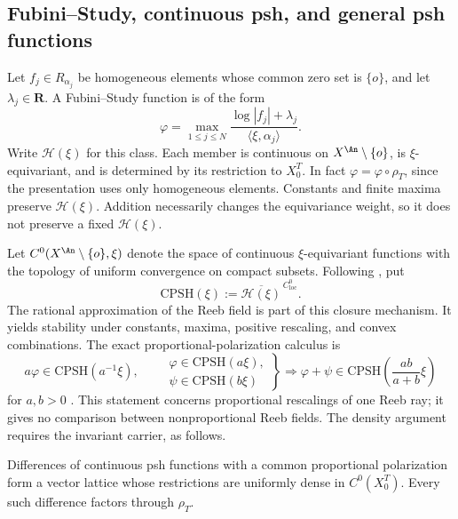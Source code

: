 \subsection{Fubini--Study, continuous psh, and general psh functions}
\label{subsec:local-cone-psh-classes}

Let $f_j\in R_{\alpha_j}$ be homogeneous elements whose common zero set is
$\{o\}$, and let $\lambda_j\in\mathbf R$.  A Fubini--Study function is
of the form
\[
 \varphi
 =\max_{1\leq j\leq N}
       \frac{\log|f_j|+\lambda_j}
            {\langle\xi,\alpha_j\rangle}.
\tag{70.60}\label{eq:local-cone-fs}
\]
Write $\mathcal H(\xi)$ for this class.  Each member is continuous on
$X^{\An}\setminus\{o\}$, is $\xi$-equivariant, and is determined by its
restriction to $X_0^T$.  In fact $\varphi=\varphi\circ\rho_T$, since
the presentation uses only homogeneous elements.  Constants and finite maxima preserve
$\mathcal H(\xi)$.  Addition necessarily changes the equivariance weight,
so it does not preserve a fixed $\mathcal H(\xi)$.

Let $C^0(X^{\An}\setminus\{o\},\xi)$ denote the space of continuous
$\xi$-equivariant functions with the topology of uniform convergence on
compact subsets.  Following \cite[Definition~3.1]{Wu24AffineCones}, put
\[
 \mathrm{CPSH}(\xi)
 :=\overline{\mathcal H(\xi)}^{\,C^0_{\mathrm{loc}}}.
\tag{70.61}\label{eq:local-cone-cpsh}
\]
The rational approximation of the Reeb field is part of this closure
mechanism.  It yields stability under constants, maxima, positive rescaling,
and convex combinations.  The exact proportional-polarization calculus is
\[
 a\varphi\in\mathrm{CPSH}(a^{-1}\xi),
 \qquad
 \left.
 \begin{array}{c}
  \varphi\in\mathrm{CPSH}(a\xi),\\
  \psi\in\mathrm{CPSH}(b\xi)
 \end{array}
 \right\}
 \Longrightarrow
 \varphi+\psi\in
 \mathrm{CPSH}\!\left(\frac{ab}{a+b}\xi\right)
\]
for $a,b>0$ \cite[Proposition~3.3]{Wu24AffineCones}.  This statement
concerns proportional rescalings of one Reeb ray; it gives no comparison
between nonproportional Reeb fields.  The density argument requires the
invariant carrier, as follows.

\begin{proposition}\label{prop:local-cone-invariant-density}
Differences of continuous psh functions with a common proportional
polarization form a vector lattice whose restrictions are uniformly dense
in $C^0(X_0^T)$.  Every such difference factors through $\rho_T$.
\end{proposition}

